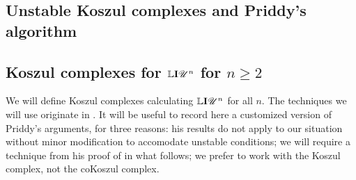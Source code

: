 \documentclass[11pt]{article}
\newcommand{\LL}[1]{{\scrK}^{#1}}%
\newcommand{\nontop}[1]{\scrU^{#1}}%
\newcommand{\Ind}[2][]{\mathbf{I}{#2}_{#1}}%
\newcommand{\derived}{\mathbb{L}}
\renewcommand{\Q}{Q}
\newcommand{\minDim}{m}
\begin{document}
\begin{KoszulComplexes2plus}
\section{Unstable Koszul complexes and Priddy's algorithm}
\subsection{Koszul complexes for $\derived\Ind{\nontop{n}}$ for $n\geq2$}
We will define Koszul complexes calculating $\derived\Ind{\nontop{n}}$ for all $n$. The techniques we will use originate in \cite{PriddyKoszul.pdf}. It will be useful to record here a customized version of Priddy's arguments, for three reasons: his results do not apply to our situation without minor modification to accomodate unstable conditions; we will require a technique from his proof of \cite[Thm 5.3]{PriddyKoszul.pdf} in what follows; we prefer to work with the Koszul complex, not the coKoszul complex.



\end{KoszulComplexes2plus}
\end{document}
